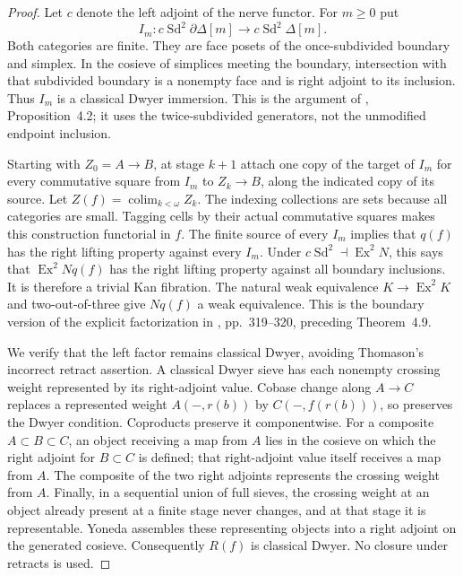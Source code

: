 \documentclass[11pt,a4paper]{article}
\theoremstyle{definition}
\theoremstyle{remark}
\begin{document}
\begin{proof}
Let $c$ denote the left adjoint of the nerve functor. For $m\geq0$ put
\[
 I_m:c\operatorname{Sd}^{2}\partial\Delta[m]\longrightarrow
 c\operatorname{Sd}^{2}\Delta[m].
\]
Both categories are finite. They are face posets of the once-subdivided boundary and simplex. In the cosieve of simplices meeting the boundary, intersection with that subdivided boundary is a nonempty face and is right adjoint to its inclusion. Thus $I_m$ is a classical Dwyer immersion. This is the argument of \citet{Thomason1980}, Proposition~4.2; it uses the twice-subdivided generators, not the unmodified endpoint inclusion.

Starting with $Z_0=A\to B$, at stage $k+1$ attach one copy of the target of $I_m$ for every commutative square from $I_m$ to $Z_k\to B$, along the indicated copy of its source. Let $Z(f)=\operatorname{colim}_{k<\omega}Z_k$. The indexing collections are sets because all categories are small. Tagging cells by their actual commutative squares makes this construction functorial in $f$. The finite source of every $I_m$ implies that $q(f)$ has the right lifting property against every $I_m$. Under $c\operatorname{Sd}^2\dashv\operatorname{Ex}^2N$, this says that $\operatorname{Ex}^2Nq(f)$ has the right lifting property against all boundary inclusions. It is therefore a trivial Kan fibration. The natural weak equivalence $K\to\operatorname{Ex}^2K$ and two-out-of-three give $Nq(f)$ a weak equivalence. This is the boundary version of the explicit factorization in \citet{Thomason1980}, pp.~319--320, preceding Theorem~4.9.

We verify that the left factor remains classical Dwyer, avoiding Thomason's incorrect retract assertion. A classical Dwyer sieve has each nonempty crossing weight represented by its right-adjoint value. Cobase change along $A\to C$ replaces a represented weight $A(-,r(b))$ by $C(-,f(r(b)))$, so preserves the Dwyer condition. Coproducts preserve it componentwise. For a composite $A\subset B\subset C$, an object receiving a map from $A$ lies in the cosieve on which the right adjoint for $B\subset C$ is defined; that right-adjoint value itself receives a map from $A$. The composite of the two right adjoints represents the crossing weight from $A$. Finally, in a sequential union of full sieves, the crossing weight at an object already present at a finite stage never changes, and at that stage it is representable. Yoneda assembles these representing objects into a right adjoint on the generated cosieve. Consequently $R(f)$ is classical Dwyer. No closure under retracts is used.
\end{proof}
\end{document}

